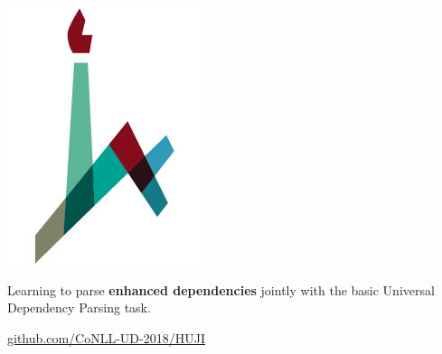 \documentclass[a0,portrait]{a0poster}
\begin{document}
\begin{minipage}[b]{.07\linewidth}
\includegraphics[width=\linewidth]{huji_logo.jpg}
\end{minipage}

\vspace{1cm}
\titlespacing*{\section}{0pt}{8mm}{5mm}



\begin{adjustbox}{margin=5mm,frame,minipage=.75\linewidth,center}
\Large\color{Navy}
Learning to parse \textbf{enhanced dependencies} jointly with the basic Universal Dependency Parsing task.
\end{adjustbox}

\begin{center}
\url{github.com/CoNLL-UD-2018/HUJI}
\end{center}
\end{document}
